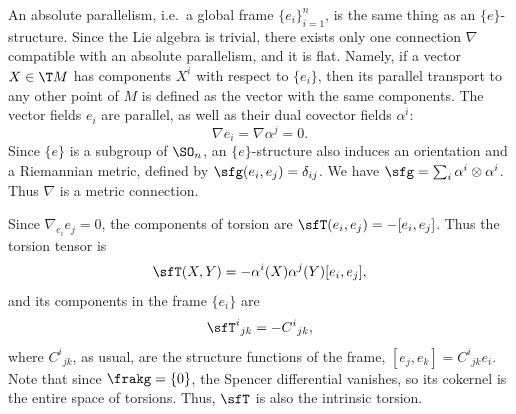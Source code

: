 \begin{example}\label{ex absolute parallelism}
    An absolute parallelism, i.e.\ a global frame $\{e_i\}_{i=1}^n$, is the same thing as an $\{e\}$-structure. Since the Lie algebra is trivial, there exists only one connection $\nabla$ compatible with an absolute parallelism, and it is flat. Namely, if a vector $X\in \T M$ has components $X^i$ with respect to $\{e_i\}$, then its parallel transport to any other point of $M$ is defined as the vector with the same components. The vector fields $e_i$ are parallel, as well as their dual covector fields $\alpha^i$:
    \[\nabla e_i=\nabla \alpha^j=0.\]
    Since $\{e\}$ is a subgroup of $\SO_n$, an $\{e\}$-structure also induces an orientation and a Riemannian metric, defined by $\sfg(e_i,e_j)=\delta_{ij}$. We have $\sfg=\sum_i \alpha^i\otimes\alpha^i$. Thus $\nabla$ is a metric connection.

    Since $\nabla_{e_i}e_j=0$, the components of torsion are $\sfT(e_i,e_j)=-[e_i,e_j]$. Thus the torsion tensor is
    \[\sfT(X,Y)=-\alpha^i(X)\alpha^j(Y)[e_i,e_j],\]
    and its components in the frame $\{e_i\}$ are 
    \[\sfT^i{}_{jk}=-C^i{}_{jk},\]
    where $C^i{}_{jk}$, as usual, are the structure functions of the frame, $[e_j,e_k]=C^i{}_{jk}e_i$. Note that since $\frakg=\{0\}$, the Spencer differential vanishes, so its cokernel is the entire space of torsions. Thus, $\sfT$ is also the intrinsic torsion.


\end{example}
